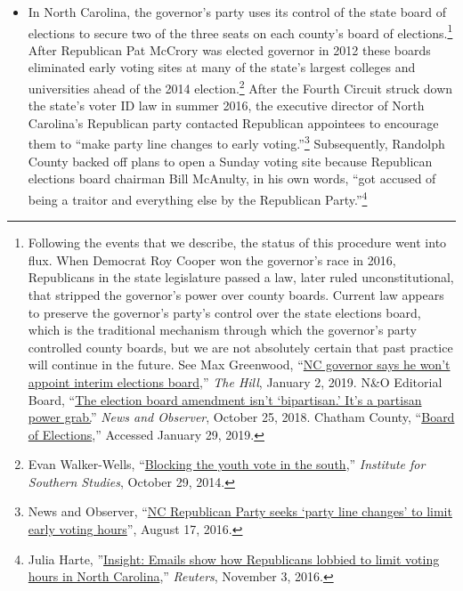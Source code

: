 \documentclass[12pt]{article}
\begin{document}
\begin{itemize}

\item In North Carolina, the governor's party uses its control of the state board of elections to secure two of the three seats on each county's board of elections.\footnote{Following the events that we describe, the status of this procedure went into flux. When Democrat Roy Cooper won the governor's race in 2016, Republicans in the state legislature passed a law, later ruled unconstitutional, that stripped the governor's power over county boards. Current law appears to preserve the governor's party's control over the state elections board, which is the traditional mechanism through which the governor's party controlled county boards, but we are not absolutely certain that past practice will continue in the future. See Max Greenwood, ``\href{https://thehill.com/homenews/campaign/423584-nc-governor-says-he-wont-appoint-interim-elections-board-citing-gop-refusal}{NC governor says he won't appoint interim elections board},'' \emph{The Hill}, January 2, 2019. N\&O Editorial Board, ``\href{https://www.newsobserver.com/latest-news/article220560460.html}{The election board amendment isn't `bipartisan.' It's a partisan power grab.}'' \emph{News and Observer}, October 25, 2018. Chatham County, ``\href{https://www.chathamnc.org/government/appointed-boards-and-committees/board-of-elections}{Board of Elections},'' Accessed January 29, 2019.} After Republican Pat McCrory was elected governor in 2012 these boards eliminated early voting sites at many of the state's largest colleges and universities ahead of the 2014 election.\footnote{Evan Walker-Wells, ``\href{https://web.archive.org/web/20150314014506/http://www.southernstudies.org/2014/10/blocking-the-youth-vote-in-the-south.html}{Blocking the youth vote in the south},'' \emph{Institute for Southern Studies}, October 29, 2014.} After the Fourth Circuit struck down the state's voter ID law in summer 2016, the executive director of North Carolina's Republican party contacted Republican appointees to encourage them to ``make party line changes to early voting.''\footnote{News and Observer, ``\href{https://www.newsobserver.com/news/politics-government/election/article96179857.html}{NC Republican Party seeks `party line changes' to limit early voting hours}'', August 17, 2016.} Subsequently, Randolph County backed off plans to open a Sunday voting site because Republican elections board chairman Bill McAnulty, in his own words, ``got accused of being a traitor and everything else by the Republican Party.''\footnote{Julia Harte, ''\href{https://www.reuters.com/article/us-usa-election-northcarolina-insight-idUSKBN12Y0ZY}{Insight: Emails show how Republicans lobbied to limit voting hours in North Carolina},'' \emph{Reuters}, November 3, 2016.}


\end{itemize}
\end{document}
